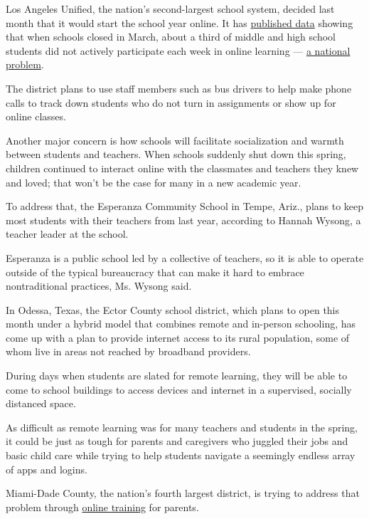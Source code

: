 Los Angeles Unified, the nation's second-largest school system, decided
last month that it would start the school year online. It has
\href{http://laschoolboard.org/sites/default/files/IAU\%20Report\%202020\%200707\%20-\%20Student\%20Engagement\%20Online\%20During\%20Closures.pdf}{published
data} showing that when schools closed in March, about a third of middle
and high school students did not actively participate each week in
online learning ---
\href{https://www.nytimes3xbfgragh.onion/2020/04/06/us/coronavirus-schools-attendance-absent.html}{a
national problem}.

The district plans to use staff members such as bus drivers to help make
phone calls to track down students who do not turn in assignments or
show up for online classes.

Another major concern is how schools will facilitate socialization and
warmth between students and teachers. When schools suddenly shut down
this spring, children continued to interact online with the classmates
and teachers they knew and loved; that won't be the case for many in a
new academic year.

To address that, the Esperanza Community School in Tempe, Ariz., plans
to keep most students with their teachers from last year, according to
Hannah Wysong, a teacher leader at the school.

Esperanza is a public school led by a collective of teachers, so it is
able to operate outside of the typical bureaucracy that can make it hard
to embrace nontraditional practices, Ms. Wysong said.

In Odessa, Texas, the Ector County school district, which plans to open
this month under a hybrid model that combines remote and in-person
schooling, has come up with a plan to provide internet access to its
rural population, some of whom live in areas not reached by broadband
providers.

During days when students are slated for remote learning, they will be
able to come to school buildings to access devices and internet in a
supervised, socially distanced space.

As difficult as remote learning was for many teachers and students in
the spring, it could be just as tough for parents and caregivers who
juggled their jobs and basic child care while trying to help students
navigate a seemingly endless array of apps and logins.

Miami-Dade County, the nation's fourth largest district, is trying to
address that problem through
\href{https://parentacademymiami.com/}{online training} for parents.

